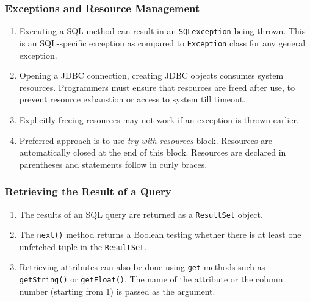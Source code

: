 \documentclass[journal,12pt,twocolumn]{IEEEtran}
\begin{document}
\subsubsection{Exceptions and Resource Management}\hfill

\begin{enumerate}
     \item Executing a SQL method can result in an \texttt{SQLexception} being
     thrown. This is an SQL-specific exception as compared to \texttt{Exception}
     class for any general exception.
     \item Opening a JDBC connection, creating JDBC objects consumes system 
     resources. Programmers must ensure that resources are freed after use, to 
     prevent resource exhaustion or access to system till timeout.
     \item Explicitly freeing resources may not work if an exception is thrown
     earlier. 
     \item Preferred approach is to use \textit{try-with-resources} block.
     Resources are automatically closed at the end of this block. Resources are
     declared in parentheses and statements follow in curly braces.
\end{enumerate}

\subsubsection{Retrieving the Result of a Query}\hfill

\begin{enumerate}
     \item The results of an SQL query are returned as a \texttt{ResultSet} 
     object.
     \item The \texttt{next()} method returns a Boolean testing whether
     there is at least one unfetched tuple in the \texttt{ResultSet}.
     \item Retrieving attributes can also be done using \texttt{get} methods
     such as \texttt{getString()} or \texttt{getFloat()}. The name of the 
     attribute or the column number (starting from 1) is passed as the 
     argument.
\end{enumerate}
\end{document}
